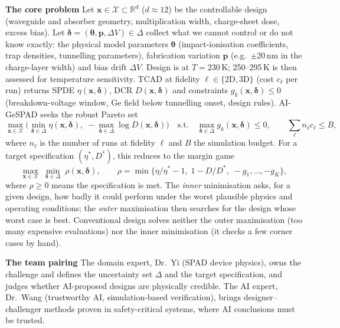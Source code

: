 \documentclass[11pt,a4paper]{article}
\begin{document}
\textbf{The core problem}
Let $\mathbf{x}\in\mathcal{X}\subset\mathbb{R}^{d}$ ($d\approx12$) be the controllable design (waveguide and absorber geometry, multiplication width, charge-sheet dose, excess bias). Let $\boldsymbol{\delta}=(\boldsymbol{\theta},\mathbf{p},\Delta V)\in\Delta$ collect what we cannot control or do not know exactly: the physical model parameters $\boldsymbol{\theta}$ (impact-ionisation coefficients, trap densities, tunnelling parameters), fabrication variation $\mathbf{p}$ (e.g.\ $\pm$20\,nm in the charge-layer width) and bias drift $\Delta V$. Design is at $T=230$\,K; 250--295\,K is then assessed for temperature sensitivity. TCAD at fidelity $\ell\in\{\mathrm{2D},\mathrm{3D}\}$ (cost $c_\ell$ per run) returns SPDE $\eta(\mathbf{x},\boldsymbol{\delta})$, DCR $D(\mathbf{x},\boldsymbol{\delta})$ and constraints $g_k(\mathbf{x},\boldsymbol{\delta})\le0$ (breakdown-voltage window, Ge field below tunnelling onset, design rules). AI-GeSPAD seeks the robust Pareto set
\begin{equation}
\max_{\mathbf{x}\in\mathcal{X}}\Big(\min_{\boldsymbol{\delta}\in\Delta}\eta(\mathbf{x},\boldsymbol{\delta}),\;-\max_{\boldsymbol{\delta}\in\Delta}\log D(\mathbf{x},\boldsymbol{\delta})\Big)\quad\text{s.t.}\quad\max_{\boldsymbol{\delta}\in\Delta}g_k(\mathbf{x},\boldsymbol{\delta})\le0,\qquad\textstyle\sum_\ell n_\ell c_\ell\le B,
\end{equation}
where $n_\ell$ is the number of runs at fidelity $\ell$ and $B$ the simulation budget. For a target specification $(\eta^*,D^*)$, this reduces to the margin game
\begin{equation}
\max_{\mathbf{x}\in\mathcal{X}}\;\min_{\boldsymbol{\delta}\in\Delta}\;\rho(\mathbf{x},\boldsymbol{\delta}),\qquad \rho=\min\{\eta/\eta^*-1,\;1-D/D^*,\;-g_1,\dots,-g_K\},
\end{equation}
where $\rho\ge0$ means the specification is met. The \emph{inner} minimisation asks, for a given design, how badly it could perform under the worst plausible physics and operating conditions; the \emph{outer} maximisation then searches for the design whose worst case is best. Conventional design solves neither the outer maximisation (too many expensive evaluations) nor the inner minimisation (it checks a few corner cases by hand).

\textbf{The team pairing} The domain expert, Dr.~Yi (SPAD device physics), owns the challenge and defines the uncertainty set $\Delta$ and the target specification, and judges whether AI-proposed designs are physically credible. The AI expert, Dr.~Wang (trustworthy AI, simulation-based verification), brings designer--challenger methods proven in safety-critical systems, where AI conclusions must be trusted.
\end{document}

